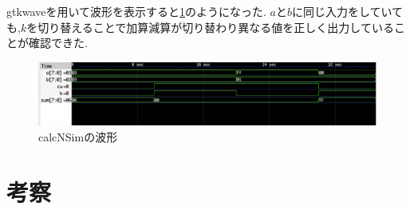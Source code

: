 \documentclass[autodetect-engine, dvi=dvipdfmx, 10pt, a4paper, ja=standard]{bxjsarticle}
\begin{document}
gtkwaveを用いて波形を表示すると\ref{fig:ex7}のようになった.
$a$と$b$に同じ入力をしていても,$k$を切り替えることで加算減算が切り替わり異なる値を正しく出力していることが確認できた.

\begin{figure}[H]
	\centering
	\includegraphics[width=\textwidth]{ex7-wave.png}
	\caption{calcNSimの波形}
	\label{fig:ex7}
\end{figure}

\section{考察}



\end{document}
